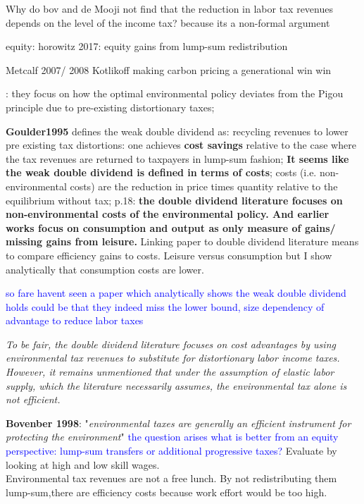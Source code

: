 
Why do bov and de Mooji not find that the reduction in labor tax revenues depends on the level of the income tax? \ar because its a non-formal argument

equity: horowitz 2017: equity gains from lump-sum redistribution

Metcalf 2007/ 2008
Kotlikoff making carbon pricing a generational win win

\cite{LansBovenberg1996OptimalAnalyses}: they focus on how the optimal environmental policy deviates from the Pigou principle due to pre-existing distortionary taxes; 

\textbf{Goulder1995} defines the weak double dividend as: recycling revenues to lower pre existing tax distortions: one achieves \textbf{cost savings} relative to the case where the tax revenues are returned to taxpayers in lump-sum fashion; 
\textbf{It seems like the weak double dividend is defined in terms of costs}; costs (i.e. non-environmental costs) are the reduction in price times quantity relative to the equilibrium without tax; p.18: \textbf{the double dividend literature focuses on non-environmental costs of the environmental policy. And earlier works focus on consumption and output as only measure of gains/ missing gains from leisure. } 
Linking paper to double dividend literature means to compare efficiency gains to costs. Leisure versus consumption \ar but I show analytically that consumption costs are lower. 

\textcolor{blue}{so fare havent seen a paper which analytically shows the weak double dividend holds \ar could be that they indeed miss the lower bound, size dependency of advantage to reduce labor taxes}

\textit{To be fair, the double dividend literature focuses on cost advantages by using environmental tax revenues to substitute for distortionary labor income taxes. However, it remains unmentioned that under the assumption of elastic labor supply, which the literature necessarily assumes, the environmental tax alone is not efficient. }

\textbf{Bovenber 1998}: "\textit{environmental taxes are  generally  an  efficient  instrument  for  protecting  the  environment}"
\textcolor{blue}{the question arises what is better from an equity perspective: lump-sum transfers or additional progressive taxes?} Evaluate by looking at high and low skill wages. 
\\
Environmental tax revenues are not a free lunch. By not redistributing them lump-sum,there are efficiency costs because work effort would be too high.




